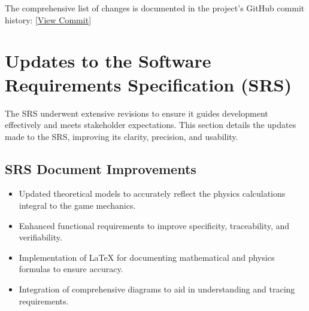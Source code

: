 \documentclass[12pt]{article}
\begin{document}
The comprehensive list of changes is documented in the project’s GitHub commit history:
[\href{https://github.com/XessX/Angry_Bird_Alike/commit/51bb012cfcda94adfd71fe193f240b0519980c65}{View Commit}]

\section{Updates to the Software Requirements Specification (SRS)}
The SRS underwent extensive revisions to ensure it guides development effectively and meets stakeholder expectations. This section details the updates made to the SRS, improving its clarity, precision, and usability.

\subsection{SRS Document Improvements}
\begin{itemize}
    \item Updated theoretical models to accurately reflect the physics calculations integral to the game mechanics.
    \item Enhanced functional requirements to improve specificity, traceability, and verifiability.
    \item Implementation of LaTeX for documenting mathematical and physics formulas to ensure accuracy.
    \item Integration of comprehensive diagrams to aid in understanding and tracing requirements.
\end{itemize}
\end{document}
